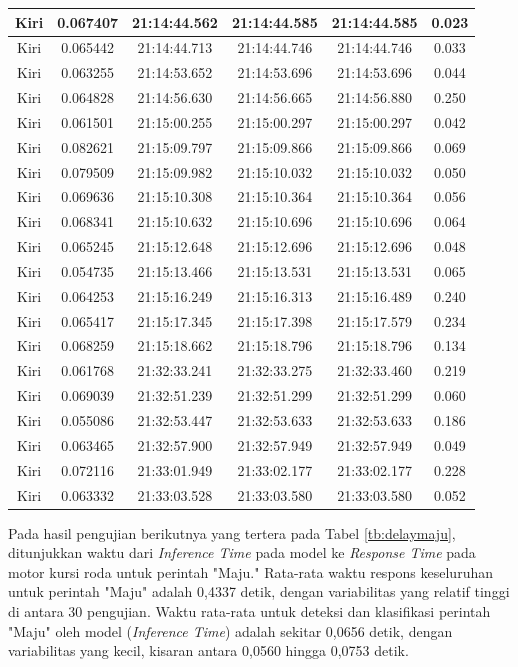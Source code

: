 \begin{longtable}{|c|c|c|c|c|c|}
      Kiri & 0.067407 & 21:14:44.562 & 21:14:44.585 & 21:14:44.585 & 0.023 \\ \hline
      Kiri & 0.065442 & 21:14:44.713 & 21:14:44.746 & 21:14:44.746 & 0.033 \\ \hline
      Kiri & 0.063255 & 21:14:53.652 & 21:14:53.696 & 21:14:53.696 & 0.044 \\ \hline
      Kiri & 0.064828 & 21:14:56.630 & 21:14:56.665 & 21:14:56.880  & 0.250 \\ \hline
      Kiri & 0.061501 & 21:15:00.255 & 21:15:00.297 & 21:15:00.297 & 0.042 \\ \hline
      Kiri & 0.082621  & 21:15:09.797 & 21:15:09.866 & 21:15:09.866 & 0.069 \\ \hline
      Kiri & 0.079509 & 21:15:09.982 & 21:15:10.032 & 21:15:10.032 & 0.050 \\ \hline
      Kiri & 0.069636 & 21:15:10.308 & 21:15:10.364 & 21:15:10.364 & 0.056 \\ \hline
      Kiri & 0.068341 & 21:15:10.632 & 21:15:10.696 & 21:15:10.696 & 0.064 \\ \hline
      Kiri & 0.065245 & 21:15:12.648 & 21:15:12.696 & 21:15:12.696 & 0.048 \\ \hline
      Kiri & 0.054735 & 21:15:13.466 & 21:15:13.531 & 21:15:13.531 & 0.065 \\ \hline
      Kiri & 0.064253 & 21:15:16.249 & 21:15:16.313 & 21:15:16.489 & 0.240 \\ \hline
      Kiri & 0.065417 & 21:15:17.345 & 21:15:17.398 & 21:15:17.579 & 0.234 \\ \hline
      Kiri & 0.068259 & 21:15:18.662 & 21:15:18.796 & 21:15:18.796 & 0.134 \\ \hline
      Kiri & 0.061768 & 21:32:33.241 & 21:32:33.275 & 21:32:33.460 & 0.219 \\ \hline
      Kiri & 0.069039 & 21:32:51.239 & 21:32:51.299 & 21:32:51.299 & 0.060 \\ \hline
      Kiri & 0.055086 & 21:32:53.447 & 21:32:53.633 & 21:32:53.633 & 0.186 \\ \hline
      Kiri & 0.063465 & 21:32:57.900 & 21:32:57.949 & 21:32:57.949 & 0.049 \\ \hline
      Kiri & 0.072116 & 21:33:01.949 & 21:33:02.177 & 21:33:02.177 & 0.228 \\ \hline
      Kiri & 0.063332 & 21:33:03.528 & 21:33:03.580 & 21:33:03.580 & 0.052 \\ \hline
\end{longtable}

Pada hasil pengujian berikutnya yang tertera pada Tabel \ref{tb:delaymaju}, ditunjukkan waktu dari \emph{Inference Time} pada model ke \emph{Response Time} pada motor kursi roda untuk perintah "Maju." Rata-rata waktu respons keseluruhan untuk perintah "Maju" adalah 0,4337 detik, dengan variabilitas yang relatif tinggi di antara 30 pengujian. Waktu rata-rata untuk deteksi dan klasifikasi perintah "Maju" oleh model (\emph{Inference Time}) adalah sekitar 0,0656 detik, dengan variabilitas yang kecil, kisaran antara 0,0560 hingga 0,0753 detik.

